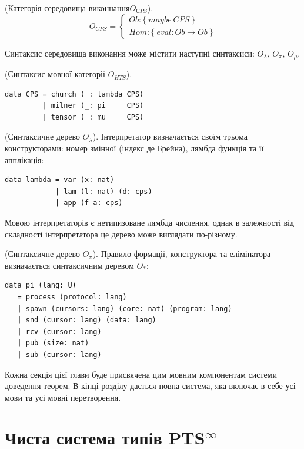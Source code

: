 \begin{definition} (Категорія середовища виконнання$O_{СPS}$).
$$
O_{CPS} =
\begin{cases}
Ob: \{\ maybe\ CPS\ \} \\
Hom: \{\ eval: Ob \rightarrow Ob\ \}
\end{cases}
$$
\end{definition}

Синтаксис середовища виконання може містити наступні синтаксиси:
$O_\lambda$, $O_\pi$, $O_\mu$.

\begin{definition} (Синтаксис мовної категорії $O_{HTS}$).
\begin{lstlisting}
data CPS = church (_: lambda CPS)
         | milner (_: pi     CPS)
         | tensor (_: mu     CPS)
\end{lstlisting}
\end{definition}

\begin{definition} (Синтаксичне дерево $O_\lambda$). Інтерпретатор визначається
своїм трьома конструкторами: номер змінної (індекс де Брейна),
лямбда функція та її апплікація:
\begin{lstlisting}
data lambda = var (x: nat)
            | lam (l: nat) (d: cps)
            | app (f a: cps)
\end{lstlisting}
Мовою інтерпретаторів є нетипизоване лямбда числення, однак в залежності
від складності інтерпретатора це дерево може виглядати по-різному.
\end{definition}

\begin{definition} (Синтаксичне дерево $O_\pi$).
Правило формації, конструктора та елімінатора визначається синтаксичним деревом $O_*$:
\begin{lstlisting}
data pi (lang: U)
   = process (protocol: lang)
   | spawn (cursors: lang) (core: nat) (program: lang)
   | snd (cursor: lang) (data: lang)
   | rcv (cursor: lang)
   | pub (size: nat)
   | sub (cursor: lang)
\end{lstlisting}
\end{definition}

Кожна секція цієї глави буде присвячена цим мовним компонентам
системи доведення теорем. В кінці розділу дається повна система, яка включає в себе усі
мови та усі мовні перетворення.

\section{Чиста система типів PTS$^\infty$}

